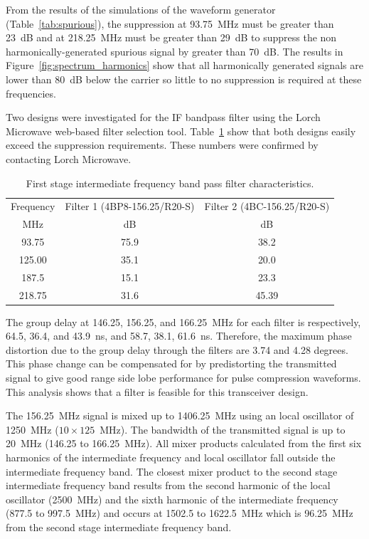 \documentclass[12pt,letterpaper]{article}
\begin{document}
From the results of the simulations of the waveform generator
(Table~\ref{tab:spurious}), the suppression at 93.75~MHz must be
greater than 23~dB and at 218.25~MHz must be greater than 29~dB to
suppress the non harmonically-generated spurious signal by greater
than 70~dB. The results in Figure~\ref{fig:spectrum_harmonics} show
that all harmonically generated signals are lower than 80~dB below the
carrier so little to no suppression is required at these frequencies.

Two designs were investigated for the IF bandpass filter using the
Lorch Microwave web-based filter selection
tool. Table~\ref{tab:lorch_filter_suppresion} show that both designs
easily exceed the suppression requirements. These numbers were
confirmed by contacting Lorch Microwave.

\begin{table}[htbp]
  \renewcommand{\multirowsetup}{\centering}
  \centering
  \caption{First stage intermediate frequency band pass filter
  characteristics.}
  \label{tab:lorch_filter_suppresion}
  \vspace{0.5em}
  \begin{tabular}{|c|c|c|}
    \hline
    Frequency & Filter 1 (4BP8-156.25/R20-S) & Filter 2 (4BC-156.25/R20-S) \\
    MHz & dB & dB \\
    \hline
    93.75  & 75.9 & 38.2 \\
    125.00  & 35.1 & 20.0 \\
    187.5   & 15.1 & 23.3 \\
    218.75  & 31.6 & 45.39 \\
    \hline
  \end{tabular}
\end{table}

The group delay at 146.25, 156.25, and 166.25~MHz for each filter is
respectively, 64.5, 36.4, and 43.9~ns, and 58.7, 38.1,
61.6~ns. Therefore, the maximum phase distortion due to the group
delay through the filters are 3.74 and 4.28 degrees. This phase change
can be compensated for by predistorting the transmitted signal to give
good range side lobe performance for pulse compression waveforms. This
analysis shows that a filter is feasible for this transceiver design.

The 156.25~MHz signal is mixed up to 1406.25~MHz using an local
oscillator of 1250~MHz ($10\times125$~MHz). The bandwidth of the
transmitted signal is up to 20~MHz (146.25 to 166.25~MHz). All mixer
products calculated from the first six harmonics of the intermediate
frequency and local oscillator fall outside the intermediate frequency
band. The closest mixer product to the second stage intermediate
frequency band results from the second harmonic of the local
oscillator (2500~MHz) and the sixth harmonic of the intermediate
frequency (877.5 to 997.5~MHz) and occurs at 1502.5 to 1622.5~MHz
which is 96.25~MHz from the second stage intermediate frequency band.
\end{document}
